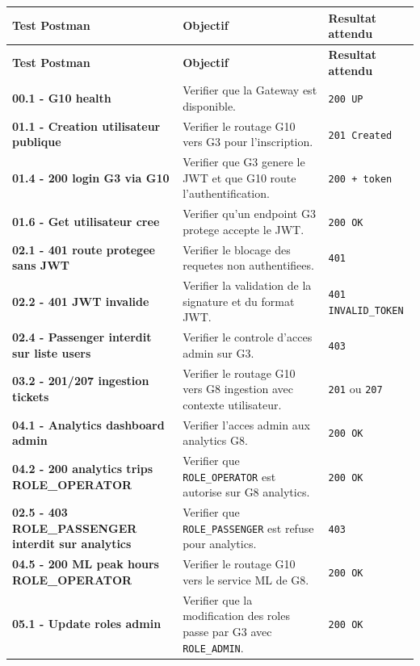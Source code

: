 \documentclass[12pt, a4paper]{article}
\begin{document}
\begin{center}
\begin{longtable}{>{\bfseries}p{4.2cm} p{5.6cm} p{3.1cm}}
\rowcolor{navyblue}
\color{white}\textbf{Test Postman} & \color{white}\textbf{Objectif} & \color{white}\textbf{Resultat attendu} \\
\endfirsthead
\rowcolor{navyblue}
\color{white}\textbf{Test Postman} & \color{white}\textbf{Objectif} & \color{white}\textbf{Resultat attendu} \\
\endhead
00.1 - G10 health & Verifier que la Gateway est disponible. & \texttt{200 UP} \\
\rowcolor{lightgray}
01.1 - Creation utilisateur publique & Verifier le routage G10 vers G3 pour l'inscription. & \texttt{201 Created} \\
01.4 - 200 login G3 via G10 & Verifier que G3 genere le JWT et que G10 route l'authentification. & \texttt{200 + token} \\
\rowcolor{lightgray}
01.6 - Get utilisateur cree & Verifier qu'un endpoint G3 protege accepte le JWT. & \texttt{200 OK} \\
02.1 - 401 route protegee sans JWT & Verifier le blocage des requetes non authentifiees. & \texttt{401} \\
\rowcolor{lightgray}
02.2 - 401 JWT invalide & Verifier la validation de la signature et du format JWT. & \texttt{401 INVALID\_TOKEN} \\
02.4 - Passenger interdit sur liste users & Verifier le controle d'acces admin sur G3. & \texttt{403} \\
\rowcolor{lightgray}
03.2 - 201/207 ingestion tickets & Verifier le routage G10 vers G8 ingestion avec contexte utilisateur. & \texttt{201} ou \texttt{207} \\
04.1 - Analytics dashboard admin & Verifier l'acces admin aux analytics G8. & \texttt{200 OK} \\
\rowcolor{lightgray}
04.2 - 200 analytics trips ROLE_OPERATOR & Verifier que \texttt{ROLE\_OPERATOR} est autorise sur G8 analytics. & \texttt{200 OK} \\
02.5 - 403 ROLE_PASSENGER interdit sur analytics & Verifier que \texttt{ROLE\_PASSENGER} est refuse pour analytics. & \texttt{403} \\
\rowcolor{lightgray}
04.5 - 200 ML peak hours ROLE_OPERATOR & Verifier le routage G10 vers le service ML de G8. & \texttt{200 OK} \\
05.1 - Update roles admin & Verifier que la modification des roles passe par G3 avec \texttt{ROLE\_ADMIN}. & \texttt{200 OK} \\
\end{longtable}
\end{center}
\end{document}
